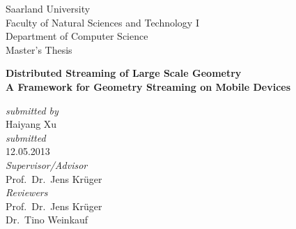 
\begin{titlepage} 

\begin{center}
    
Saarland University\\
Faculty of Natural Sciences and Technology I \\
Department of Computer Science \\[1.5cm]


{\Large Master's Thesis}\\[2.0cm]
 { 

{\LARGE \bfseries Distributed Streaming of Large Scale Geometry}\\[0.5cm]
{\Large \bfseries
 A Framework for Geometry Streaming on Mobile Devices} \\[1.5cm]
}
    
\begin{normalsize}
  \emph{submitted by}\\
  Haiyang Xu\\[1.2cm]
  
    \emph{submitted}\\
    12.05.2013\\[1.2cm]
    
  
  \emph{Supervisor/Advisor} \\
  Prof.~Dr.~Jens Kr\"uger\\[1.2cm]

  
  \emph{Reviewers} \\
  Prof.~Dr.~Jens Kr\"uger \\[0.1cm]
  Dr.~Tino Weinkauf \\[0.1cm]
\end{normalsize}

\end{center}


\end{titlepage}

%
%

